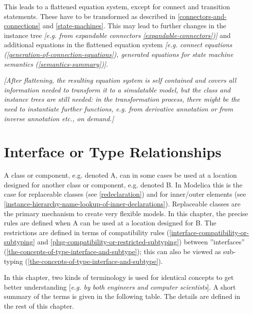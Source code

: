 \documentclass[10pt,a4paper]{report}
\def\doublelabel#1{\label{#1}\hypertarget{#1}{}}
\begin{document}
This leads to a flattened equation system, except for connect and
transition statements. These have to be transformed as described in
\ref{connectors-and-connections} and \ref{state-machines}. This may lead to further changes in the
instance tree \emph{{[}e.g. from expandable connectors \ref{expandable-connectors}){]}} 
and additional equations in the flattened equation
system \emph{{[}e.g. connect equations (\ref{generation-of-connection-equations}), generated
equations for state machine semantics (\ref{semantics-summary}){]}}.

\emph{{[}After flattening, the resulting equation system is self
contained and covers all information needed to transform it to a
simulatable model, but the class and instance trees are still needed: in
the transformation process, there might be the need to instantiate
further functions, e.g. from derivative annotation or from inverse
annotation etc., on demand.{]}}

\chapter{Interface or Type Relationships}\doublelabel{interface-or-type-relationships}

A class or component, e.g. denoted A, can in some cases be used at a
location designed for another class or component, e.g. denoted B. In
Modelica this is the case for replaceable classes (see \ref{redeclaration}) and
for inner/outer elements (see \ref{instance-hierarchy-name-lookup-of-inner-declarations}). 
Replaceable classes are the
primary mechanism to create very flexible models. In this chapter, the
precise rules are defined when A can be used at a location designed for
B. The restrictions are defined in terms of compatibility rules
(\ref{interface-compatibility-or-subtyping} and \ref{plug-compatibility-or-restricted-subtyping}) between ''interfaces'' (\ref{the-concepts-of-type-interface-and-subtype}); this can
also be viewed as sub-typing (\ref{the-concepts-of-type-interface-and-subtype}).

In this chapter, two kinds of terminology is used for identical concepts
to get better understanding {[}\emph{e.g. by both engineers and computer
scientists}{]}. A short summary of the terms is given in the following
table. The details are defined in the rest of this chapter.
\end{document}
